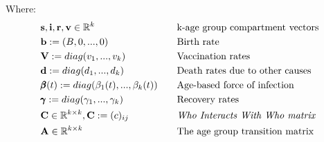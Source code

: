 \documentclass{article}
\theoremstyle{definition}
\begin{document}
Where:
\begin{align*}
&\mathbf{s}, \mathbf{i}, \mathbf{r} ,\mathbf{v}\in \mathbb{R}^k& \quad& \text{k-age group compartment vectors}\\
&\mathbf{b}:=(B,0,...,0)& \quad& \text{Birth rate}\\
&\mathbf{V}:=diag(v_1,...,v_k) &\quad& \text{Vaccination rates}\\
&\mathbf{d}:=diag(d_1,...,d_k) &\quad& \text{Death rates due to other causes}\\
&\pmb{\beta}(t):=diag(\beta_1(t),...,\beta_k(t))&\quad& \text{Age-based force of infection}\\
&\pmb{\gamma}:=diag(\gamma_1,...,\gamma_k)&\quad&\text{Recovery rates}\\
&\mathbf{C}\in \mathbb{R}^{k\times k}, \mathbf{C} := (c)_{ij} &\quad& \text{\emph{Who Interacts With Who matrix}}\\
&\mathbf{A}\in\mathbb{R}^{k\times k}&\quad& \text{The age group transition matrix}
\end{align*}
\end{document}
